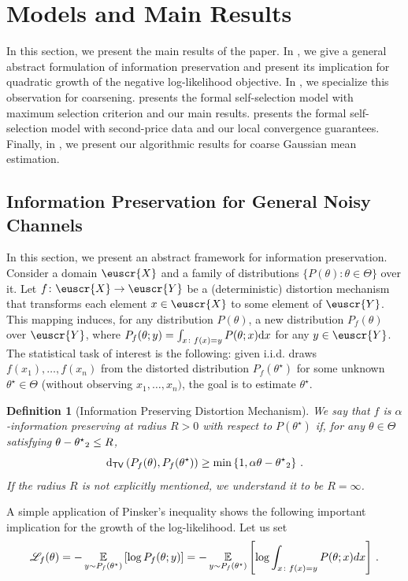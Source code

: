 \documentclass[11pt,letterpaper]{article}
\theoremstyle{plain}
\newtheorem{definition}{Definition}
\theoremstyle{definition}
\theoremstyle{remark}
\newcommand{\inbrace}[1]{\ensuremath{\left\{#1\right\}}}
\newcommand{\inparen}[1]{\ensuremath{\left(#1\right)}}
\newcommand{\insquare}[1]{\ensuremath{\left[#1\right]}}
\let\norm\relax
\newcommand{\norm}[1]{\ensuremath{\left\lVert #1 \right\rVert}}
\newcommand{\E}{\operatornamewithlimits{\mathbb{E}}}
\newcommand{\tv}[2]{\operatorname{d}_{\mathsf{TV}}{\inparen{#1,#2}}}
\newcommand{\iid}{i.i.d.}
\newcommand{\customcal}[1]{\euscr{#1}}
\newcommand{\cX}{\customcal{X}}
\newcommand{\cY}{\customcal{Y}}
\newcommand{\negLL}{\ensuremath{\mathscr{L}}}
\newcommand{\hypo}[1]{\mathdutchcal{#1}}
\newcommand{\hyL}{\hypo{L}}
\renewcommand{\d}{{\rm d}}
\renewcommand{\hyL}{\negLL}
\begin{document}
{%
    


\section{Models and Main Results}
    In this section, we present the main results of the paper. In , we give a general abstract formulation of information preservation and present its implication for quadratic growth of the negative log-likelihood objective. In , we specialize this observation for coarsening.
     presents the formal self-selection model with maximum selection criterion and our main results.
     presents the formal self-selection model with second-price data and our local convergence guarantees. 
    Finally,
    in , 
    we present our algorithmic results for coarse Gaussian mean estimation. 
    
    \subsection{Information Preservation for General Noisy Channels}
    \label{sec:info-pres-noisyChannel}

    In this section, we present an abstract framework for information preservation.
    Consider a domain $\cX$ and a family of distributions $\{ P(\theta)\colon \theta \in \Theta\}$ over it.
    Let $f\colon \cX \to \cY$ be a  (deterministic) distortion mechanism that transforms each element $x \in \cX$ to some element of $\cY$.
    This mapping induces, for any distribution $P(\theta)$, a new distribution $P_f(\theta)$ over $\cY$, where $P_f(\theta; y) = \int_{x\colon f(x) = y} P(\theta; x) \d x $ for any $y \in \cY$.
    The statistical task of interest is the following: given \iid{} draws $f(x_1),\dots,f(x_n)$ from the distorted distribution $P_f(\theta^\star)$ for some unknown $\theta^\star \in \Theta$ (without observing $x_1,\dots,x_n)$, the goal is to estimate $\theta^\star.$

    \begin{definition}[Information Preserving Distortion Mechanism]\label{def:model:informationPreservingDistortion}
    We say that $f$ is \emph{$\alpha$-information preserving at radius $R>0$ with respect to $P(\theta^\star)$} if, 
    for any $\theta \in \Theta$ satisfying $\norm{\theta-\theta^\star}_2\leq R$,
    \[
        \tv{P_f(\theta)}{P_f(\theta^\star)}
        \geq \min\inbrace{1, \alpha \norm{\theta - \theta^\star}_2}\,.
    \]
    If the radius $R$ is not explicitly mentioned,
    we understand it to be $R=\infty$.
    \end{definition}
    A simple application of Pinsker's inequality shows the following important implication for the growth of the log-likelihood. Let us set
    \[
    \hyL_f(\theta) 
    =
    -\E_{y \sim P_f(\theta^\star)}
    \insquare{\log P_f(\theta; y)}
    =
    -\E_{y \sim P_f(\theta^\star)}
    \insquare{\log \int_{x\colon f(x) = y} P(\theta; x) d x}\,.
    \]
    
}
\end{document}
